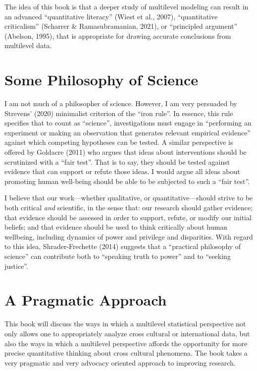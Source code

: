 \documentclass[
  letterpaper,
  DIV=11,
  numbers=noendperiod]{scrreprt}
\begin{document}
The idea of this book is that a deeper study of multilevel modeling can
result in an advanced ``quantitative literacy'' (Wiest et al., 2007),
 ``quantitative criticalism'' (Scharrer \&
Ramasubramanian, 2021),  or ``principled
argument'' (Abelson, 1995), that is appropriate for drawing accurate
conclusions from multilevel data.

\section{Some Philosophy of Science}\label{some-philosophy-of-science}

I am not much of a philosopher of science. However, I am very persuaded
by Strevens' (2020) minimalist criterion of the ``iron rule''. In
essence, this rule specifies that to count as ``science'',
investigations must engage in ``performing an experiment or making an
observation that generates relevant empirical evidence'' against which
competing hypotheses can be tested. A similar perspective is offered by
Goldacre (2011) who argues that ideas about interventions should be
scrutinized with a ``fair test''. That is to say, they should be tested
against evidence that can support or refute those ideas. I would argue
all ideas about promoting human well-being should be able to be
subjected to such a ``fair test''. 

I believe that our work---whether qualitative, or quantitative---should
strive to be both critical \emph{and} scientific, in the sense that: our
research should gather evidence; that evidence should be assessed in
order to support, refute, or modify our initial beliefs; and that
evidence should be used to think critically about human wellbeing,
including dynamics of power and privilege and disparities. With regard
to this idea, Shrader-Frechette (2014) suggests that a ``practical
philosophy of science'' can contribute both to ``speaking truth to
power'' and to ``seeking justice''.

\section{A Pragmatic Approach}\label{a-pragmatic-approach}

This book will discuss the ways in which a multilevel statistical
perspective not only allows one to appropriately analyze cross cultural
or international data, but also the ways in which a multilevel
perspective affords the opportunity for more precise quantitative
thinking about cross cultural phenomena. The book takes a very pragmatic
and very advocacy oriented approach to improving research.
 
\end{document}

